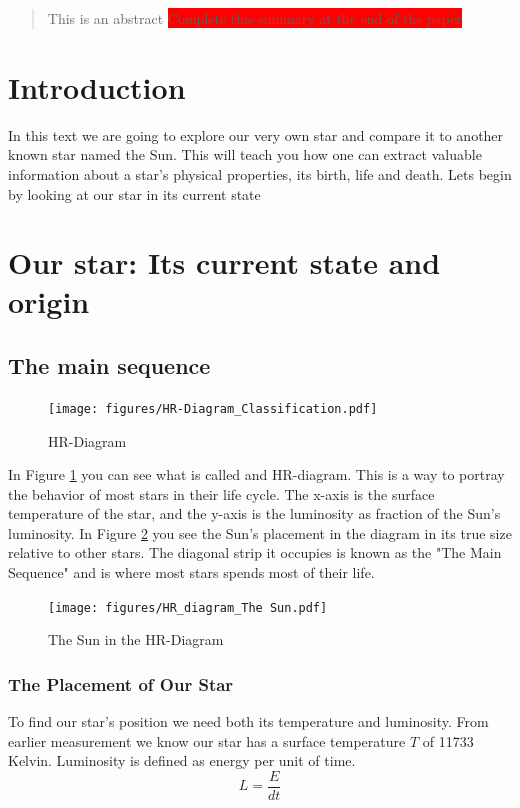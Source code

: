 \documentclass[reprint,english,notitlepage]{revtex4-2}
\begin{document}
\title{}
\author{Candidates: 15369 \& Jannik Eschler}
\date{\today}

\begin{abstract}
    This is an abstract \colorbox{red}{Complete this summary at the end of the paper}
\end{abstract}
\maketitle
\section{Introduction} \label{sec: introduction}
In this text we are going to explore our very own star and compare it to another known star named the Sun. This will teach you how one can extract valuable information about a star's physical properties, its birth, life and death. Lets begin by looking at our star in its current state      

\section{Our star: Its current state and origin}
\subsection{The main sequence}
\begin{figure}[h!]
  \centering
  \texttt{[image: figures/HR-Diagram\_Classification.pdf]}
  \caption{HR-Diagram}
  \label{fig: HR_diagram}
\end{figure}
In Figure \ref{fig: HR_diagram} you can see what is called and HR-diagram. This is a way to portray the behavior of most stars in their life cycle. The x-axis is the surface temperature of the star, and the y-axis is the luminosity as fraction of the Sun's luminosity. In Figure \ref{fig: HR_diagram_The_Sun} you see the Sun's placement in the diagram in its true size relative to other stars. The diagonal strip it occupies is known as the "The Main Sequence" and is where most stars spends most of their life. 

\begin{figure}[h!]
  \centering
  \texttt{[image: figures/HR\_diagram\_The Sun.pdf]}
  \caption{The Sun in the HR-Diagram}
  \label{fig: HR_diagram_The_Sun}
\end{figure}

\subsubsection*{The Placement of Our Star}
To find our star's position we need both its temperature and luminosity. From earlier measurement we know our star has a surface temperature $ T $ of 11733 Kelvin. Luminosity is defined as energy per unit of time. 
\begin{equation} \label{eq: Luminosity}
  L = \frac{E}{dt}
\end{equation}  
\end{document}
